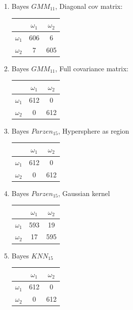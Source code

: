 \documentclass[a4paper]{article}
\begin{document}
\begin{multicols}{2}
\begin{enumerate}
\item Bayes $GMM_{11}$, Diagonal cov matrix:

\begin{tabular}{ | l | c | c | }
\hline
& $\omega_1$ & $\omega_2$ \\
\hline
  $\omega_1$ & 606 & 6 \\
\hline
  $\omega_2$ & 7 & 605 \\
\hline
\end{tabular}


\item Bayes $GMM_{11}$, Full covariance matrix:

\begin{tabular}{ | l | c | c | }
\hline
& $\omega_1$ & $\omega_2$ \\
\hline
  $\omega_1$ & 612 & 0 \\
\hline
  $\omega_2$ & 0 & 612 \\
\hline
\end{tabular}


\item Bayes $Parzen_{15}$, Hypersphere as region

\begin{tabular}{ | l | c | c | }
\hline
& $\omega_1$ & $\omega_2$ \\
\hline
  $\omega_1$ & 612 & 0 \\
\hline
  $\omega_2$ & 0 & 612 \\
\hline
\end{tabular}



\item Bayes $Parzen_{15}$, Gaussian kernel

\begin{tabular}{ | l | c | c | }
\hline
& $\omega_1$ & $\omega_2$ \\
\hline
  $\omega_1$ & 593 & 19 \\
\hline
  $\omega_2$ & 17 & 595 \\
\hline
\end{tabular}


\item Bayes $KNN_{15}$

\begin{tabular}{ | l | c | c | }
\hline
& $\omega_1$ & $\omega_2$ \\
\hline
  $\omega_1$ & 612 & 0 \\
\hline
  $\omega_2$ & 0 & 612 \\
\hline
\end{tabular}



\end{enumerate}
\end{multicols}
\end{document}
